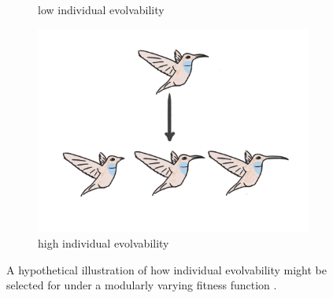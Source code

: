\begin{figure}
\begin{minipage}[]{0.45\textwidth}
\begin{subfigure}[b]{\textwidth}
    \caption{low individual evolvability}
  \end{subfigure}%
\end{minipage}%
\begin{minipage}[]{0.45\textwidth}
\begin{subfigure}[b]{\textwidth}
    \centering
  \includegraphics[width=\textwidth]{img/hbird_highevol}
    \caption{high individual evolvability}
  \end{subfigure}
\end{minipage}%
 
\captionsetup{singlelinecheck=off,justification=raggedright}
  \caption[Hypothetical Illustration of a Hummingbird Individual Evolvability]{A hypothetical illustration of how individual evolvability might be selected for under a modularly varying fitness function \cite{Kashtan2005SpontaneousMotifs}.}
  \label{fig:hummingbird_selection_pressure}
\end{figure}